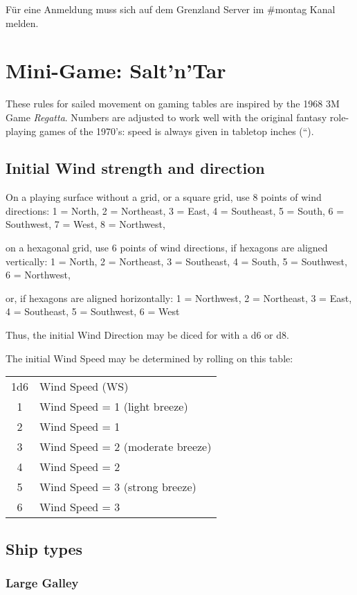 \documentclass[11pt]{wbzine}
\begin{document}
\begin{multicols}{2}
	Für eine Anmeldung muss sich auf dem Grenzland Server im
	\#montag Kanal melden.

\section{Mini-Game: Salt'n'Tar}

These rules for sailed movement on gaming tables are inspired by the
1968 3M Game \emph{Regatta}. Numbers are adjusted to work well with the
original fantasy role-playing games of the 1970's: speed is always given
in tabletop inches (``).

\subsection{Initial Wind strength and
direction}

On a playing surface without a grid, or a square grid, use 8 points of
wind directions: 1 = North, 2 = Northeast, 3 = East, 4 = Southeast, 5 =
South, 6 = Southwest, 7 = West, 8 = Northwest,

on a hexagonal grid, use 6 points of wind directions, if hexagons are
aligned vertically: 1 = North, 2 = Northeast, 3 = Southeast, 4 = South,
5 = Southwest, 6 = Northwest,

or, if hexagons are aligned horizontally: 1 = Northwest, 2 = Northeast,
3 = East, 4 = Southeast, 5 = Southwest, 6 = West

Thus, the initial Wind Direction may be diced for with a d6 or d8.

The initial Wind Speed may be determined by rolling on this table:

\begin{tabularx}{\columnwidth}{cZ}
1d6 & Wind Speed (WS) \\
1 & Wind Speed = 1 (light breeze) \\
2 & Wind Speed = 1 \\
3 & Wind Speed = 2 (moderate breeze) \\
4 & Wind Speed = 2 \\
5 & Wind Speed = 3 (strong breeze) \\
6 & Wind Speed = 3 \\
\end{tabularx}

\subsection{Ship types}

\subsubsection{Large Galley}


\end{multicols}
\end{document}
